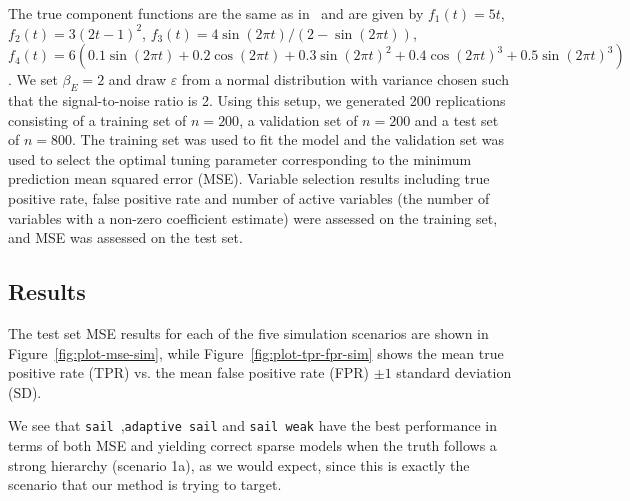 \documentclass[12pt,letter]{article}\usepackage[]{graphicx}\usepackage[]{color}
\newcommand{\sail}{\texttt{sail}}
\begin{document}
The true component functions are the same as in~\citep{lin2006component,huang2010variable} and are given by $f_1(t) = 5t$, $f_2(t) = 3(2t-1)^2$, $f_3(t) = 4\sin(2\pi t) / (2-\sin(2\pi t))$, $f_4(t) = 6(0.1\sin(2\pi t) + 0.2 \cos(2\pi t)  + 0.3 \sin(2\pi t)^2 + 0.4\cos(2\pi t)^3+0.5\sin(2\pi t)^3)$. We set $\beta_E = 2$ and draw $\varepsilon$ from a normal distribution with variance chosen such that the signal-to-noise ratio is 2. Using this setup, we generated 200 replications consisting of a training set of $n=200$, a validation set of $n=200$ and a test set of $n=800$. The training set was used to fit the model and the validation set was used to select the optimal tuning parameter corresponding to the minimum prediction mean squared error (MSE). Variable selection results including true positive rate, false positive rate and number of active variables (the number of variables with a non-zero coefficient estimate) were assessed on the training set, and MSE was assessed on the test set. %

\subsection{Results}

The test set MSE results for each of the five simulation scenarios are shown in Figure~\ref{fig:plot-mse-sim}, while Figure~\ref{fig:plot-tpr-fpr-sim} shows the mean true positive rate (TPR) vs. the mean false positive rate (FPR) $\pm 1$ standard deviation (SD). 





We see that \sail~,\texttt{adaptive sail} and \texttt{sail weak} have the best performance in terms of both MSE and yielding correct sparse models when the truth follows a strong hierarchy (scenario 1a), as we would expect, since this is exactly the scenario that our method is trying to target. 
\end{document}
